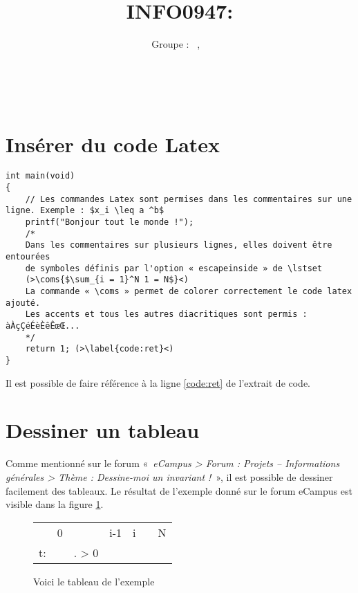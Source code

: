 \documentclass[a4paper, 11pt, oneside]{article}
\title{INFO0947: \intitule}
\author{Groupe \GrNbr : \PrenomUN~\textsc{\NomUN}, \PrenomDEUX~\textsc{\NomDEUX}}
\date{}
\newcommand{\coms}[1]{\textcolor{MidnightBlue}{#1}}
\newcommand{\tablemat}{~}
\begin{document}
\maketitle
\newpage
\tablemat
\newpage


\section{Insérer du code Latex}

\begin{lstlisting}[caption={Un programme tout simple}]
int main(void)
{
	// Les commandes Latex sont permises dans les commentaires sur une ligne. Exemple : $x_i \leq a ^b$
	printf("Bonjour tout le monde !");
	/*
	Dans les commentaires sur plusieurs lignes, elles doivent être entourées
	de symboles définis par l'option « escapeinside » de \lstset
	(>\coms{$\sum_{i = 1}^N 1 = N$}<)
	La commande « \coms » permet de colorer correctement le code latex ajouté.
	Les accents et tous les autres diacritiques sont permis : àÀçÇéÉèÈêÊœŒ...
	*/
	return 1; (>\label{code:ret}<)
}
\end{lstlisting}

Il est possible de faire référence à la ligne \ref{code:ret} de l'extrait de code.

\section{Dessiner un tableau}

Comme mentionné sur le forum «~\emph{eCampus > Forum : Projets -- Informations générales > Thème : Dessine-moi un invariant !}~», il est possible de dessiner facilement des tableaux. Le résultat de l'exemple donné sur le forum eCampus est visible dans la figure \ref{fig:exemple}.

\begin{figure}[!h]
\centering
\begin{tabular}{l|llr|ll|l}
 & 0 &  & \multicolumn{1}{r|}{i-1} & i &  & N \\ \cline{2-6}
t: & \cellcolor[HTML]{FFCC67} & \cellcolor[HTML]{FFCC67}. > 0 & \cellcolor[HTML]{FFCC67} &  &  &  \\ \cline{2-6}
\end{tabular}
\caption{Voici le tableau de l'exemple}
\label{fig:exemple}
\end{figure}
\end{document}
